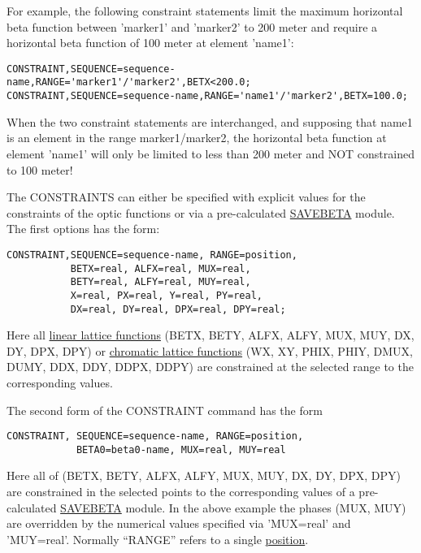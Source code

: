 For example, the following
constraint statements limit the maximum horizontal beta function between
'marker1' and 'marker2' to 200 meter and require a horizontal beta
function of 100 meter at element 'name1':  
\begin{verbatim}
CONSTRAINT,SEQUENCE=sequence-name,RANGE='marker1'/'marker2',BETX<200.0;
CONSTRAINT,SEQUENCE=sequence-name,RANGE='name1'/'marker2',BETX=100.0;
\end{verbatim}

When the two constraint statements are interchanged, and supposing that
name1 is an element in the range marker1/marker2, the horizontal beta 
function at element 'name1' will only be limited to less than 200 meter
and NOT constrained to 100 meter! 

The CONSTRAINTS can either be specified with explicit values for the
constraints of the optic functions or via a pre-calculated
\href{../control/general.html#savebeta}{SAVEBETA} module. The first
options has the form: 
\begin{verbatim}
CONSTRAINT,SEQUENCE=sequence-name, RANGE=position,
           BETX=real, ALFX=real, MUX=real,                                            
           BETY=real, ALFY=real, MUY=real,
           X=real, PX=real, Y=real, PY=real,
           DX=real, DY=real, DPX=real, DPY=real;

\end{verbatim}

Here all \href{../Introduction/tables.html#linear}{linear lattice functions} 
(BETX, BETY, ALFX, ALFY, MUX, MUY, DX, DY, DPX, DPY)
or \href{../Introduction/tables.html#chrom}{chromatic lattice functions}
(WX, XY, PHIX, PHIY, DMUX, DUMY, DDX, DDY, DDPX, DDPY)
are constrained at the selected range to the corresponding values.

The second form of the CONSTRAINT command has the form
\begin{verbatim}
CONSTRAINT, SEQUENCE=sequence-name, RANGE=position,
            BETA0=beta0-name, MUX=real, MUY=real
\end{verbatim}

Here all of (BETX, BETY, ALFX, ALFY, MUX, MUY, DX, DY, DPX, DPY)
are constrained in the selected points to the corresponding values
of a pre-calculated \href{../control/general.html#savebeta}{SAVEBETA} module.
In the above example
the phases (MUX, MUY) are overridden by the numerical values specified via
'MUX=real' and 'MUY=real'.
Normally ``RANGE'' refers to a single
\href{../Introduction/ranges.html#position}{position}.

